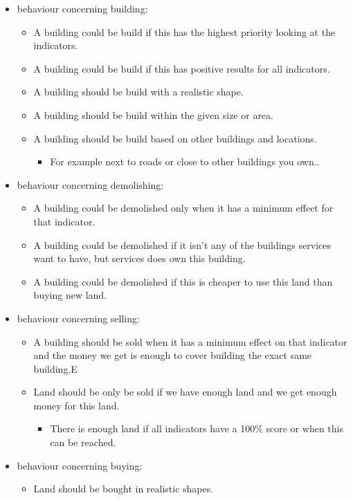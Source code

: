 \begin{itemize}
\begin{itemize}
	\end{itemize}
	\item behaviour concerning building:
	\begin{itemize}
		\item A building could be build if this has the highest priority looking at the indicators.
		\item A building could be build if this has positive results for all indicators.
		\item A building should be build with a realistic shape.
		\item A building should be build within the given size or area.
		\item A building should be build based on other buildings and locations.
		\begin{itemize}
			\item For example next to roads or close to other buildings you own..
		\end{itemize}
	\end{itemize}
	\item behaviour concerning demolishing:
	\begin{itemize}
		\item A building could be demolished only when it has a minimum effect for that indicator.
		\item A building could be demolished if it isn't any of the buildings services want to have, but services does own this building.
		\item A building could be demolished if this is cheaper to use this land than buying new land.
	\end{itemize}
	\item behaviour concerning selling:
	\begin{itemize}
		\item 	A building should be sold when it has a minimum effect on that indicator and the money we get is enough to cover building the exact same building.E
		\item	Land should be only be sold if we have enough land and we get enough money for this land.
		\begin{itemize}
			\item 	There is enough land if all indicators have a 100$\%$ score or when this can be reached.
		\end{itemize}
	\end{itemize}
	\item behaviour concerning buying:
	\begin{itemize}
		\item 	Land should be bought in realistic shapes. 

\end{itemize}
\end{itemize}
